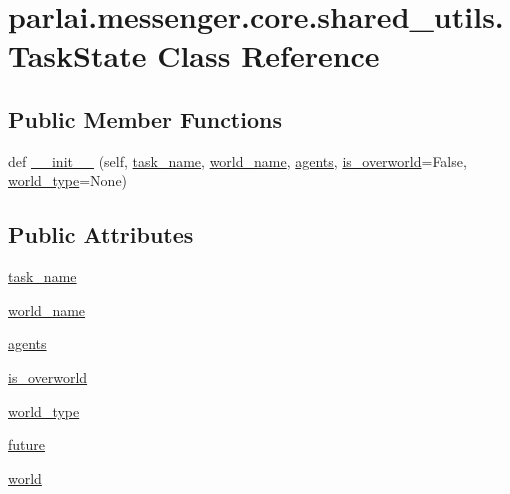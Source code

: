 \hypertarget{classparlai_1_1messenger_1_1core_1_1shared__utils_1_1TaskState}{}\section{parlai.\+messenger.\+core.\+shared\+\_\+utils.\+Task\+State Class Reference}
\label{classparlai_1_1messenger_1_1core_1_1shared__utils_1_1TaskState}
\subsection*{Public Member Functions}
\begin{DoxyCompactItemize}
\item 
def \hyperlink{classparlai_1_1messenger_1_1core_1_1shared__utils_1_1TaskState_a9d427e45f50abc063ba48b03b5483518}{\+\_\+\+\_\+init\+\_\+\+\_\+} (self, \hyperlink{classparlai_1_1messenger_1_1core_1_1shared__utils_1_1TaskState_a2da94274e9a05c208ae7ec542570cb64}{task\+\_\+name}, \hyperlink{classparlai_1_1messenger_1_1core_1_1shared__utils_1_1TaskState_ac9f5068a006d3ba1cb9cff8418664826}{world\+\_\+name}, \hyperlink{classparlai_1_1messenger_1_1core_1_1shared__utils_1_1TaskState_ac21ef353f92812fb20293a00aa21e1c6}{agents}, \hyperlink{classparlai_1_1messenger_1_1core_1_1shared__utils_1_1TaskState_a21ac11f745c67af1f0e9c3565ed6137e}{is\+\_\+overworld}=False, \hyperlink{classparlai_1_1messenger_1_1core_1_1shared__utils_1_1TaskState_ade4009480c39652af0d07cd86e49f586}{world\+\_\+type}=None)
\end{DoxyCompactItemize}
\subsection*{Public Attributes}
\begin{DoxyCompactItemize}
\item 
\hyperlink{classparlai_1_1messenger_1_1core_1_1shared__utils_1_1TaskState_a2da94274e9a05c208ae7ec542570cb64}{task\+\_\+name}
\item 
\hyperlink{classparlai_1_1messenger_1_1core_1_1shared__utils_1_1TaskState_ac9f5068a006d3ba1cb9cff8418664826}{world\+\_\+name}
\item 
\hyperlink{classparlai_1_1messenger_1_1core_1_1shared__utils_1_1TaskState_ac21ef353f92812fb20293a00aa21e1c6}{agents}
\item 
\hyperlink{classparlai_1_1messenger_1_1core_1_1shared__utils_1_1TaskState_a21ac11f745c67af1f0e9c3565ed6137e}{is\+\_\+overworld}
\item 
\hyperlink{classparlai_1_1messenger_1_1core_1_1shared__utils_1_1TaskState_ade4009480c39652af0d07cd86e49f586}{world\+\_\+type}
\item 
\hyperlink{classparlai_1_1messenger_1_1core_1_1shared__utils_1_1TaskState_ae1a396eeb10672336bf186f9a781b0bb}{future}
\item 
\hyperlink{classparlai_1_1messenger_1_1core_1_1shared__utils_1_1TaskState_a82a05884231f5ae06bcc255f5b2b47c5}{world}
\end{DoxyCompactItemize}


